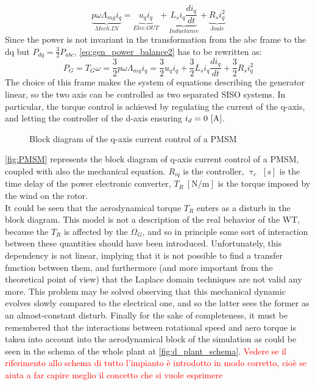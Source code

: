 \begin{equation}
  \underbrace{p\omega\Lambda_{mg}i_q}_{Mech. IN} = \underbrace{u_qi_q}_{Elec. OUT}+ \underbrace{L_{s} i_q\frac{di_q}{dt}}_{Inductance} + \underbrace{R_{s}i_q^2}_{Joule}
  \label{eq:gen_power_balance2}
\end{equation}
Since the power is not invariant in the transformation from the abc frame to the dq but $P_{dq} = \frac{3}{2}P_{abc}$, \autoref{eq:gen_power_balance2} has to be rewritten as:
\begin{equation}
  P_G = T_G\omega = \frac{3}{2}p\omega\Lambda_{mg}i_q = \frac{3}{2}u_qi_q + \frac{3}{2}L_{s} i_q\frac{di_q}{dt} + \frac{3}{2}R_{s} i_q^2
  \label{eq:gen_power_balance3}
\end{equation}
The choice of this frame makes the system of equations describing the generator linear, so the two axis can be controlled as two separated \acrfull{SISO} systems. In particular, the torque control is achieved by regulating the current of the q-axis, and letting the controller of the d-axis ensuring $i_d=0 \, \left[\si{\ampere}\right]$.
\begin{figure}[htb]

\caption{Block diagram of the q-axis current control of a PMSM}
\label{fig:PMSM}
\end{figure}

\autoref{fig:PMSM} represents the block diagram of q-axis current control of a \acrshort{PMSM}, coupled with also the mechanical equation. $R_{iq}$ is the controller, $\uptau_{c}$ $\left[\si{\second}\right]$ is the time delay of the power electronic converter, $T_R \ \left[\si{\newton \per \meter}\right]$ is the torque imposed by the wind on the rotor.\\
It could be seen that the aerodynamical torque $T_R$ enters as a disturb in the block diagram. This model is not a description of the real behavior of the \acrshort{WT}, because the $T_R$ is affected by the $\Omega_G$, and so in principle some sort of interaction between these quantities should have been introduced. Unfortunately, this dependency is not linear, implying that it is not possible to find a transfer function between them, and furthermore (and more important from the theoretical point of view) that the Laplace domain techniques are not valid any more. This problem may be solved observing that this mechanical dynamic evolves slowly compared to the electrical one, and so the latter sees the former as an almost-constant disturb. Finally for the sake of completeness, it must be remembered that the interactions between rotational speed and aero torque is taken into account into the aerodynamical block of the simulation as could be seen in the schema of the whole plant at \autoref{fig:d_plant_schema}. \textcolor{red}{Vedere se il riferimento allo schema di tutto l'impianto è introdotto in modo corretto, cioè se aiuta a far capire meglio il concetto che si vuole esprimere}\\

